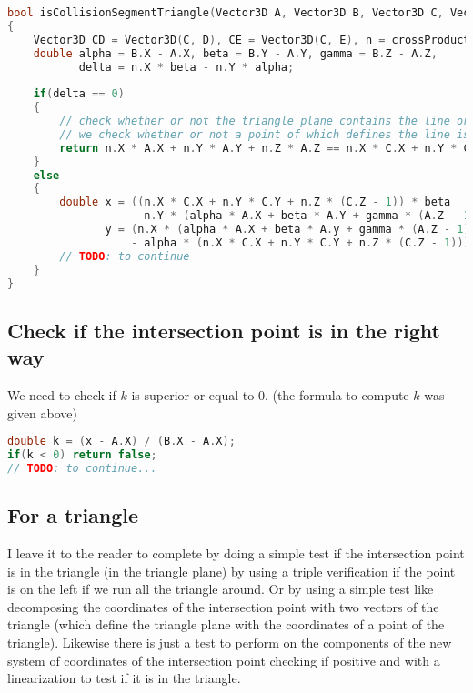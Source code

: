 \documentclass{article}
\begin{document}
    	\begin{lstlisting}[language=C++, caption={Implementation in C++ to check (and compute) if there is an intersection point}]
bool isCollisionSegmentTriangle(Vector3D A, Vector3D B, Vector3D C, Vector3D D,Vector3D E)
{
    Vector3D CD = Vector3D(C, D), CE = Vector3D(C, E), n = crossProduct(CD, CE);
    double alpha = B.X - A.X, beta = B.Y - A.Y, gamma = B.Z - A.Z,
           delta = n.X * beta - n.Y * alpha;
    	    	    	    	
    if(delta == 0)
    {
        // check whether or not the triangle plane contains the line or is strictly parallel
        // we check whether or not a point of which defines the line is in the triangle plane
        return n.X * A.X + n.Y * A.Y + n.Z * A.Z == n.X * C.X + n.Y * C.Y + n.Z * C.Z;
    }
   	else
   	{ 
        double x = ((n.X * C.X + n.Y * C.Y + n.Z * (C.Z - 1)) * beta
                   - n.Y * (alpha * A.X + beta * A.Y + gamma * (A.Z - 1)) / delta,
               y = (n.X * (alpha * A.X + beta * A.y + gamma * (A.Z - 1))
                   - alpha * (n.X * C.X + n.Y * C.Y + n.Z * (C.Z - 1))) / delta;
        // TODO: to continue
    }
}
    	\end{lstlisting}
    
    \subsection{Check if the intersection point is in the right way}
    
    	We need to check if $k$ is superior or equal to 0. (the formula to compute $k$ was given above)
    
		    	\begin{lstlisting}[language=C++, caption={Implementation to check if the intersection point is in the right way}]
double k = (x - A.X) / (B.X - A.X);
if(k < 0) return false;
// TODO: to continue...
    	\end{lstlisting}
    
    \subsection{For a triangle}
    
    	I leave it to the reader to complete by doing a simple test if the intersection point is in the triangle (in the triangle plane) by using a triple verification if the point is on the left if we run all the triangle around. Or by using a simple test like decomposing the coordinates of the intersection point with two vectors of the triangle (which define the triangle plane with the coordinates of a point of the triangle). Likewise there is just a test to perform on the components of the new system of coordinates of the intersection point checking if positive and with a linearization to test if it is in the triangle.
    
\end{document}
